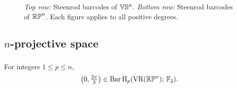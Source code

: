 \begin{figure}
	\centering
	
	\caption{\emph{Top row:} Steenrod barcodes of $\mathbb{V}\mathbb{S}^n$. \emph{Bottom row:} Steenrod barcodes of $\mathbb{RP}^n$. Each figure applies to all positive degrees.}
	\label{fig:sq barcodes}
\end{figure}

\subsection{$n$-projective space}

\subsubsection{}\label{prop:RPn bar}
\lemma For integers $1 \leq p \leq n$,
\[
\left(0, \tfrac{2\pi}{3}\right) \in \operatorname{Bar} \operatorname{H}_{p}(\operatorname{VR}(\mathbb{RP}^n);\,{\mathbb{F}_2}).
\]

